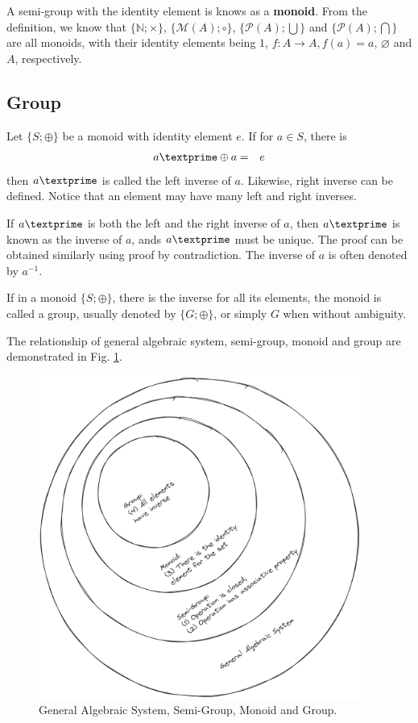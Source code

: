 A semi-group with the identity element is knows as a \textbf{monoid}. From the definition, we know that $\{\mathbb{N}; \times\}$, $\{\mathcal{M}(A); \circ\}$, $\{\mathcal{P}(A); \bigcup\}$ and $\{\mathcal{P}(A); \bigcap\}$ are all monoids, with their identity elements being $1$, $f: A\rightarrow A, f(a)=a$, $\varnothing$ and $A$, respectively.

\subsection{Group}

Let $\{S; \oplus\}$ be a monoid with identity element $e$. If for $a\in S$, there is
\begin{eqnarray}
	a\textprime \oplus a &=& e \nonumber
\end{eqnarray}
then $a\textprime$ is called the left inverse of $a$. Likewise, right inverse can be defined. Notice that an element may have many left and right inverses.

If $a\textprime$ is both the left and the right inverse of $a$, then $a\textprime$ is known as the inverse of $a$, ands $a\textprime$ must be unique. The proof can be obtained similarly using proof by contradiction. The inverse of $a$ is often denoted by $a^{-1}$.

If in a monoid $\{S; \oplus\}$, there is the inverse for all its elements, the monoid is called a group, usually denoted by $\{G; \oplus\}$, or simply $G$ when without ambiguity.

The relationship of general algebraic system, semi-group, monoid and group are demonstrated in Fig. \ref{fig:group_definition}.
\begin{figure}[htbp]
	\centering
	\includegraphics[width=300pt]{chapters/abstract-algebra-basics/figures/group_definition.png}
	\caption{General Algebraic System, Semi-Group, Monoid and Group.} \label{fig:group_definition}
\end{figure}


